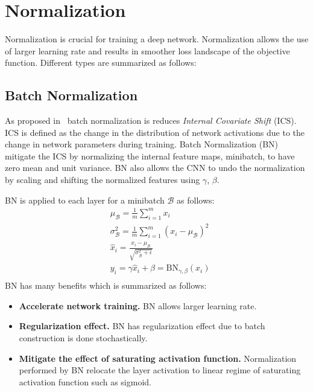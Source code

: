 \section{Normalization}
Normalization is crucial for training a deep network. Normalization allows the use of larger learning rate and results in smoother loss landscape of the objective function. Different types are summarized as follows:
\subsection{Batch Normalization}
As proposed in~\cite{ioffe2015batch} batch normalization is reduces {\em  Internal Covariate Shift} (ICS). ICS is defined as the change in the distribution of network activations due to the change in network parameters during training. Batch Normalization (BN) mitigate the ICS by normalizing the internal feature maps, minibatch, to have zero mean and unit variance. BN also allows the CNN to undo the normalization by scaling and shifting the normalized features using $\gamma$, $\beta$. 

BN is applied to each layer for a minibatch $\mathcal{B}$ as follows:
\begin{equation}
\begin{split}
    & \mu_{\mathcal{B}} = \frac{1}{m}\sum^{m}_{i=1}x_{i}\\
    &  \sigma^{2}_{\mathcal{B}} = \frac{1}{m}\sum^{m}_{i=1}\left(x_{i}-\mu_{\mathcal{B}}\right)^{2}\\
    &  \hat{x}_{i} = \frac{x_{i} - \mu_{\mathcal{B}}}{\sqrt{\sigma^{2}_{\mathcal{B}}+\epsilon}} \\
    &  y_{i} = \gamma\hat{x}_{i} + \beta = \text{BN}_{\gamma, \beta}\left(x_{i}\right) \\
\end{split}
\end{equation}
BN has many benefits which is summarized as follows:
\begin{itemize}
    \item \textbf{Accelerate network training.} BN allows larger learning rate.
    \item \textbf{Regularization effect.} BN has regularization effect due to batch construction is done stochastically.
    \item \textbf{Mitigate the effect of saturating activation function.} Normalization performed by BN relocate the layer activation to linear regime of saturating activation function such as sigmoid.
\end{itemize}

